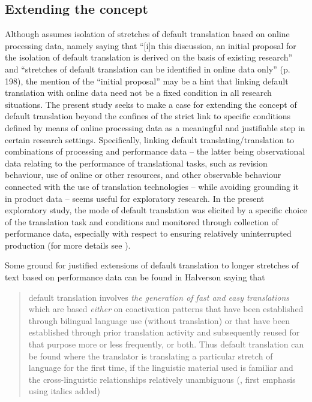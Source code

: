 \documentclass[output=paper]{langscibook}
\begin{document}
\subsection{Extending the concept}\label{sec:kamenicka:2.2}

Although \citet{Halverson2019} assumes isolation of stretches of default translation based on online processing data, namely saying that “[i]n this discussion, an initial proposal for the isolation of default translation is derived on the basis of existing research” and “stretches of default translation can be identified in online data only” (p. 198), the mention of the “initial proposal” may be a hint that linking default translation with online data need not be a fixed condition in all research situations. The present study seeks to make a case for extending the concept of default translation beyond the confines of the strict link to specific conditions defined by means of online processing data as a meaningful and justifiable step in certain research settings. Specifically, linking default translating/translation to combinations of processing and performance data – the latter being observational data relating to the performance of translational tasks, such as revision behaviour, use of online or other resources, and other observable behaviour connected with the use of translation technologies – while avoiding grounding it in product data – seems useful for exploratory research. In the present exploratory study, the mode of default translation was elicited by a specific choice of the translation task and conditions and monitored through collection of performance data, especially with respect to ensuring relatively uninterrupted production (for more details see ).

Some ground for justified extensions of default translation to longer stretches of text based on performance data can be found in Halverson saying that

\begin{quote}default translation involves \textit{the generation of fast and easy            translations} which are based \textit{either} on coactivation patterns that have been established through bilingual language use (without translation) or that have been established through prior translation activity and subsequently reused for that purpose more or less frequently, or both. Thus default translation can be found where the translator is translating a particular stretch of language for the first time, if the linguistic material used is familiar and the cross-linguistic relationships relatively unambiguous (\citealt[196]{Halverson2019}, first emphasis using italics added)\end{quote}
\end{document}

